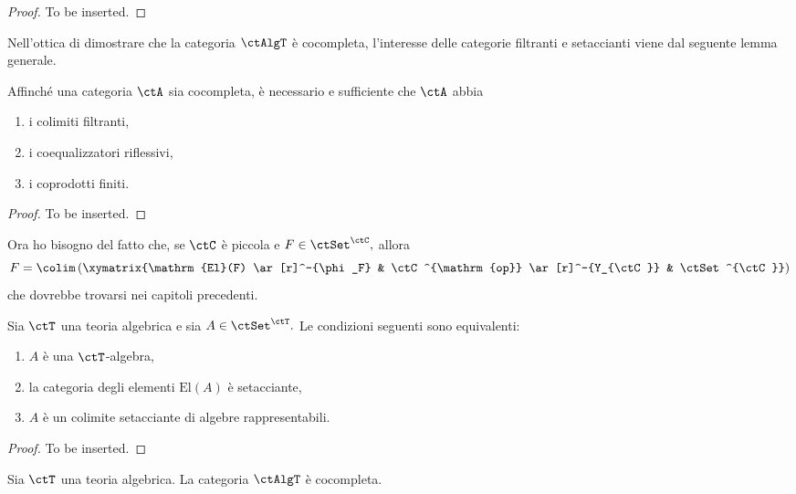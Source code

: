 \begin{proof}
To be inserted.
\end{proof}

Nell'ottica di dimostrare che la categoria $\ctAlgT$ è cocompleta, l'interesse delle categorie filtranti e setaccianti viene dal
seguente lemma generale.

\begin{lemma}\label{lemma_cocompl_sift}
Affinché una categoria $\ctA$ sia cocompleta, è necessario e sufficiente che $\ctA$ abbia
\begin{enumerate}
\item i colimiti filtranti,
\item i coequalizzatori riflessivi,
\item i coprodotti finiti.
\end{enumerate}
\end{lemma}

\begin{proof}
To be inserted.
\end{proof}

\begin{warning}\label{caveat_colim_rappr}
Ora ho bisogno del fatto che, se $\ctC$ è piccola e $F \in \ctSet^{\ctC},$ allora
$$F = \colim\left(\xymatrix{\mathrm{El}(F) \ar[r]^-{\phi_F} & \ctC^{\mathrm{op}} \ar[r]^-{Y_{\ctC}} & \ctSet^{\ctC}}\right) $$
che dovrebbe trovarsi nei capitoli precedenti.
\end{warning} 

\begin{lemma}\label{lemma_alg_sift_rapp}
Sia $\ctT$ una teoria algebrica e sia $A \in \ctSet^{\ctT}.$ Le condizioni seguenti sono equivalenti:
\begin{enumerate}
\item $A$ è una $\ctT$-algebra,
\item la categoria degli elementi $\mathrm{El}(A)$ è setacciante,
\item $A$ è un colimite setacciante di algebre rappresentabili.
\end{enumerate}
\end{lemma}

\begin{proof}
To be inserted.
\end{proof}

\begin{proposition}\label{prop_AlgT_cocompl}
Sia $\ctT$ una teoria algebrica. La categoria $\ctAlgT$ è cocompleta.
\end{proposition}

